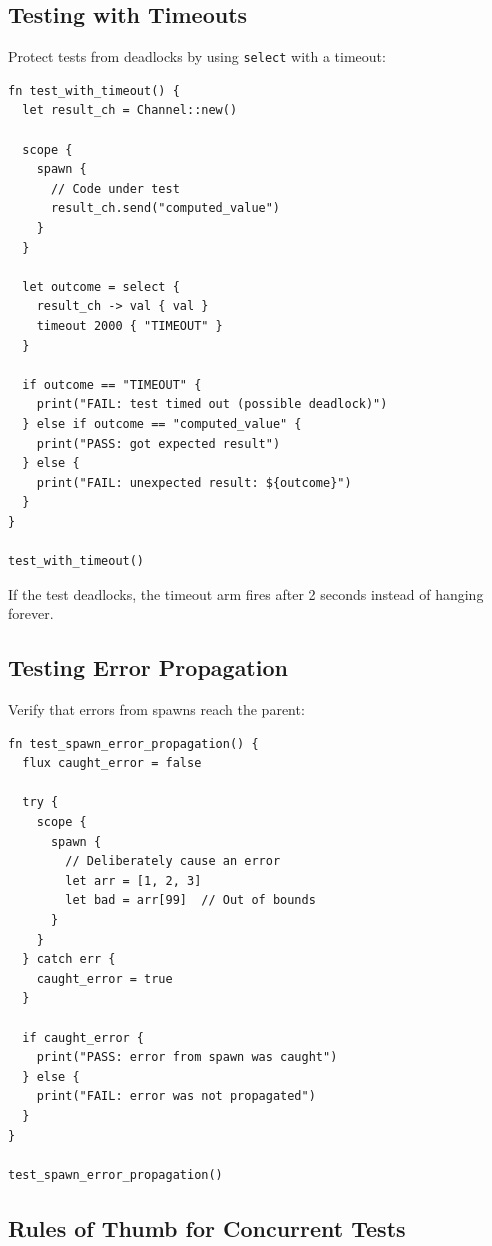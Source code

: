 \subsection{Testing with Timeouts}

Protect tests from deadlocks by using \lstinline|select| with a timeout:

\begin{lstlisting}[language=Lattice, caption={Test with timeout protection}]
fn test_with_timeout() {
  let result_ch = Channel::new()

  scope {
    spawn {
      // Code under test
      result_ch.send("computed_value")
    }
  }

  let outcome = select {
    result_ch -> val { val }
    timeout 2000 { "TIMEOUT" }
  }

  if outcome == "TIMEOUT" {
    print("FAIL: test timed out (possible deadlock)")
  } else if outcome == "computed_value" {
    print("PASS: got expected result")
  } else {
    print("FAIL: unexpected result: ${outcome}")
  }
}

test_with_timeout()
\end{lstlisting}

If the test deadlocks, the timeout arm fires after 2 seconds instead of hanging forever.

\subsection{Testing Error Propagation}

Verify that errors from spawns reach the parent:

\begin{lstlisting}[language=Lattice, caption={Testing error propagation}]
fn test_spawn_error_propagation() {
  flux caught_error = false

  try {
    scope {
      spawn {
        // Deliberately cause an error
        let arr = [1, 2, 3]
        let bad = arr[99]  // Out of bounds
      }
    }
  } catch err {
    caught_error = true
  }

  if caught_error {
    print("PASS: error from spawn was caught")
  } else {
    print("FAIL: error was not propagated")
  }
}

test_spawn_error_propagation()
\end{lstlisting}

\subsection{Rules of Thumb for Concurrent Tests}

